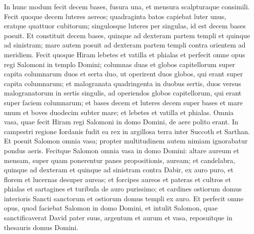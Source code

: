 \begin{biblechapter}
\verse In hunc modum fecit decem bases, fusura una, et mensura scalpturaque consimili. 
\verse Fecit quoque decem luteres aereos; quadraginta batos capiebat luter unus, eratque quattuor cubitorum; singulosque luteres per singulas, id est decem bases posuit. 
\verse Et constituit decem bases, quinque ad dexteram partem templi et quinque ad sinistram; mare autem posuit ad dexteram partem templi contra orientem ad meridiem. 
\verse Fecit quoque Hiram lebetes et vatilla et phialas et perfecit omne opus regi Salomoni in templo Domini; 
\verse columnas duas et globos capitellorum super capita columnarum duos et serta duo, ut operirent duos globos, qui erant super capita columnarum; 
\verse et malogranata quadringenta in duobus sertis, duos versus malogranatorum in sertis singulis, ad operiendos globos capitellorum, qui erant super faciem columnarum; 
\verse et bases decem et luteres decem super bases 
\verse et mare unum et boves duodecim subter mare; 
\verse et lebetes et vatilla et phialas. Omnia vasa, quae fecit Hiram regi Salomoni in domo Domini, de aere polito erant. 
\verse In campestri regione Iordanis fudit ea rex in argillosa terra inter Succoth et Sarthan. 
\verse Et posuit Salomon omnia vasa; propter multitudinem autem nimiam ignorabatur pondus aeris. 
\verse Fecitque Salomon omnia vasa in domo Domini: altare aureum et mensam, super quam ponerentur panes propositionis, auream; 
\verse et candelabra, quinque ad dexteram et quinque ad sinistram contra Dabir, ex auro puro, et florem et lucernas desuper aureas; et forcipes aureos 
\verse et pateras et cultros et phialas et sartagines et turibula de auro purissimo; et cardines ostiorum domus interioris Sancti sanctorum et ostiorum domus templi ex auro. 
\verse Et perfecit omne opus, quod faciebat Salomon in domo Domini, et intulit Salomon, quae sanctificaverat David pater suus, argentum et aurum et vasa, reposuitque in thesauris domus Domini. 
\end{biblechapter}

